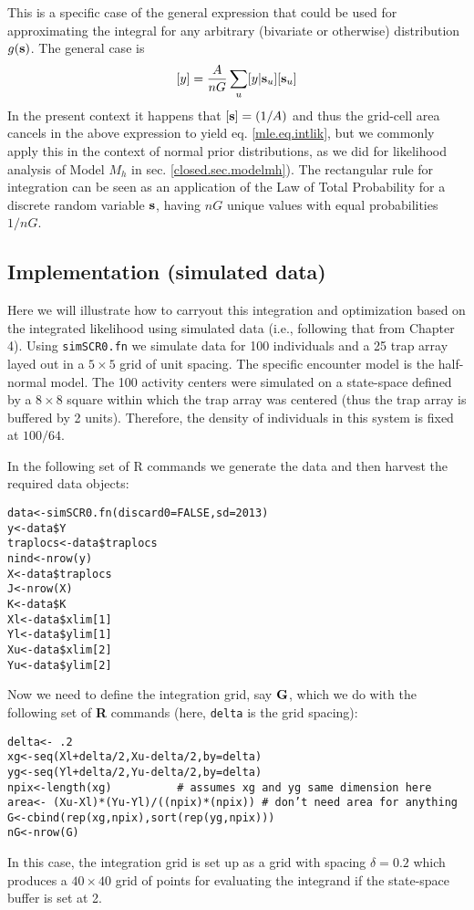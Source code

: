 This is a specific case of the general expression that could be used
for approximating the integral for any arbitrary (bivariate or otherwise)
distribution $g({\bf s})$. The general case is
\[
[y]  = \frac{A}{nG} \sum_{u} [y|{\bf s}_{u}] [{\bf s}_{u}]
\]
 In the present context it happens that  $[{\bf s}] = (1/A)$
and thus the grid-cell area cancels in the above
expression to yield eq. \ref{mle.eq.intlik}, but we commonly apply
this in the context of normal prior distributions, as we did for
likelihood analysis of Model $M_{h}$ in  sec. \ref{closed.sec.modelmh}).
The rectangular rule for integration can be seen as an application of
the Law of Total Probability for a discrete random variable ${\bf
  s}$, having $nG$ 
unique values with equal probabilities $1/nG$.



\subsection{ Implementation (simulated data)}

Here we will illustrate how to carryout this integration and
optimization based on the integrated likelihood using simulated data
 (i.e., following that from Chapter 4). Using \mbox{\tt simSCR0.fn}
 we simulate data for 100 individuals and a 25 trap array
layed out in a $5 \times 5$ grid of unit spacing.  The specific encounter
model is the half-normal model. The 100 activity centers were
simulated on a state-space defined by a $8 \times 8$ square 
within which the
trap array was centered (thus the trap array is buffered by 2
units). Therefore, the density of individuals in this system is fixed
at $100/64$.

In the following set of R commands we generate the data and 
then harvest the required data objects:
\begin{verbatim}
data<-simSCR0.fn(discard0=FALSE,sd=2013)
y<-data$Y
traplocs<-data$traplocs
nind<-nrow(y)
X<-data$traplocs
J<-nrow(X)
K<-data$K
Xl<-data$xlim[1]
Yl<-data$ylim[1]
Xu<-data$xlim[2]
Yu<-data$ylim[2]
\end{verbatim}
Now we need to define the integration grid, say ${\bf G}$, which we do with
the following set of {\bf R} commands (here, \mbox{\tt delta} is the grid spacing):
\begin{verbatim}
delta<- .2
xg<-seq(Xl+delta/2,Xu-delta/2,by=delta) 
yg<-seq(Yl+delta/2,Yu-delta/2,by=delta) 
npix<-length(xg)          # assumes xg and yg same dimension here
area<- (Xu-Xl)*(Yu-Yl)/((npix)*(npix)) # don’t need area for anything
G<-cbind(rep(xg,npix),sort(rep(yg,npix)))
nG<-nrow(G)
\end{verbatim}
In this case, the integration grid is set up as a grid with spacing
$\delta = 0.2$ which produces a $40 \times 40$ grid of points for evaluating the
integrand if the state-space buffer is set at 2.

